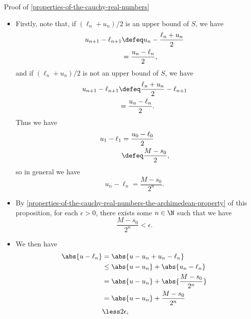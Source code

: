 \begin{Proof}{Proof of \cref{properties-of-the-cauchy-real-numbers}}
\begin{itemize}
\begin{itemize}
                \item Firstly, note that, if $(\ell_{n}+u_{n})/2$ is an upper bound of $S$, we have
                    \begin{align*}
                        u_{n+1}-\ell_{n+1} &\defeq u_{n}-\frac{\ell_{n}+u_{n}}{2}\\
                                           &=      \frac{u_{n}-\ell_{n}}{2},
                    \end{align*}
                    and if $(\ell_{n}+u_{n})/2$ is not an upper bound of $S$, we have
                    \begin{align*}
                        u_{n+1}-\ell_{n+1} &\defeq \frac{\ell_{n}+u_{n}}{2}-\ell_{n+1}\\
                                           &=      \frac{u_{n}-\ell_{n}}{2}.
                    \end{align*}
                    Thus we have
                    \begin{align*}
                        u_{1}-\ell_{1} &=      \frac{u_{0}-\ell_{0}}{2}\\
                                       &\defeq \frac{M-s_{0}}{2},
                    \end{align*}
                    so in general we have
                    \[
                        u_{n}-\ell_{n}%
                        =%
                        \frac{M-s_{0}}{2^{n}}.%
                    \]%
                \item By \cref{properties-of-the-cauchy-real-numbers-the-archimedean-property} of this proposition, for each $\epsilon\greater0$, there exists some $n\in\N$ such that we have
                    \[
                        \frac{M-s_{0}}{2^{n}}%
                        \less%
                        \epsilon.%
                    \]%
                \item We then have
                    \begin{align*}
                        \abs{u-\ell_{n}} &=     \abs{u-u_{n}+u_{n}-\ell_{n}}\\
                                         &\leq  \abs{u-u_{n}}+\abs{u_{n}-\ell_{n}}\\
                                         &=     \abs{u-u_{n}}+\abs{\frac{M-s_{0}}{2^{n}}}\\
                                         &=     \abs{u-u_{n}}+\frac{M-s_{0}}{2^{n}}\\
                                         &\less 2\epsilon,%
                    \end{align*}

\end{itemize}
\end{itemize}
\end{Proof}
